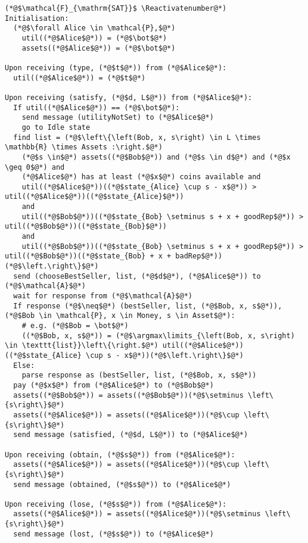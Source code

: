 \Suppressnumber
\begin{lstlisting}[label=satfunc, style=numbers]
(*@$\mathcal{F}_{\mathrm{SAT}}$ \Reactivatenumber@*)
Initialisation:
  (*@$\forall Alice \in \mathcal{P},$@*)
    util((*@$Alice$@*)) = (*@$\bot$@*)
    assets((*@$Alice$@*)) = (*@$\bot$@*)

Upon receiving (type, (*@$t$@*)) from (*@$Alice$@*):
  util((*@$Alice$@*)) = (*@$t$@*)

Upon receiving (satisfy, (*@$d, L$@*)) from (*@$Alice$@*):
  If util((*@$Alice$@*)) == (*@$\bot$@*):
    send message (utilityNotSet) to (*@$Alice$@*)
    go to Idle state
  find list = (*@$\left\{\left(Bob, x, s\right) \in L \times \mathbb{R} \times Assets :\right.$@*)
    (*@$s \in$@*) assets((*@$Bob$@*)) and (*@$s \in d$@*) and (*@$x \geq 0$@*) and
    (*@$Alice$@*) has at least (*@$x$@*) coins available and
    util((*@$Alice$@*))((*@$state_{Alice} \cup s - x$@*)) > util((*@$Alice$@*))((*@$state_{Alice}$@*))
    and
    util((*@$Bob$@*))((*@$state_{Bob} \setminus s + x + goodRep$@*)) > util((*@$Bob$@*))((*@$state_{Bob}$@*))
    and
    util((*@$Bob$@*))((*@$state_{Bob} \setminus s + x + goodRep$@*)) > util((*@$Bob$@*))((*@$state_{Bob} + x + badRep$@*))(*@$\left.\right\}$@*)
  send (chooseBestSeller, list, (*@$d$@*), (*@$Alice$@*)) to (*@$\mathcal{A}$@*)
  wait for response from (*@$\mathcal{A}$@*)
  If response (*@$\neq$@*) (bestSeller, list, (*@$Bob, x, s$@*)), (*@$Bob \in \mathcal{P}, x \in Money, s \in Asset$@*):
    # e.g. (*@$Bob = \bot$@*)
    ((*@$Bob, x, s$@*)) = (*@$\argmax\limits_{\left(Bob, x, s\right) \in \texttt{list}}\left\{\right.$@*) util((*@$Alice$@*))((*@$state_{Alice} \cup s - x$@*))(*@$\left.\right\}$@*)
  Else:
    parse response as (bestSeller, list, (*@$Bob, x, s$@*))
  pay (*@$x$@*) from (*@$Alice$@*) to (*@$Bob$@*)
  assets((*@$Bob$@*)) = assets((*@$Bob$@*))(*@$\setminus \left\{s\right\}$@*)
  assets((*@$Alice$@*)) = assets((*@$Alice$@*))(*@$\cup \left\{s\right\}$@*)
  send message (satisfied, (*@$d, L$@*)) to (*@$Alice$@*)

Upon receiving (obtain, (*@$s$@*)) from (*@$Alice$@*):
  assets((*@$Alice$@*)) = assets((*@$Alice$@*))(*@$\cup \left\{s\right\}$@*)
  send message (obtained, (*@$s$@*)) to (*@$Alice$@*)

Upon receiving (lose, (*@$s$@*)) from (*@$Alice$@*):
  assets((*@$Alice$@*)) = assets((*@$Alice$@*))(*@$\setminus \left\{s\right\}$@*)
  send message (lost, (*@$s$@*)) to (*@$Alice$@*)
\end{lstlisting}
